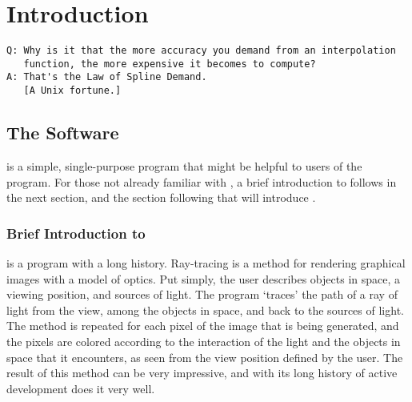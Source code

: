 \chapter{Introduction}
\ifMKwx
	\small
\begin{verbatim}
Q: Why is it that the more accuracy you demand from an interpolation
   function, the more expensive it becomes to compute?
A: That's the Law of Spline Demand.
   [A Unix fortune.]
\end{verbatim}
	\normalsize
\else
\fi %

\section{The Software}%
\IXpkgu{} is a simple, single-purpose program that might
be helpful to users of the \IXpov{} program.
For those not already familiar with \IXpov{},
a brief introduction to \IXpov{} follows in the next section,
and the section following that will introduce \IXpkg.

	\subsection{Brief Introduction to \dtypov}
\IXpov{} is a  program with a long history.
Ray-tracing is a method for rendering
graphical images with a model of optics.
Put simply, the user describes objects in space, a viewing position,
and sources of light. The program `traces' the path of a ray of
light from the view, among the objects in space, and back to the sources
of light. The method is repeated for each pixel of the image that
is being generated, and the pixels are colored according to the
interaction of the light and the objects in space that it encounters,
as seen from the view position defined by the user.
The result of this method can be very impressive, and with its
long history of active development \IXpov{} does it very well.

